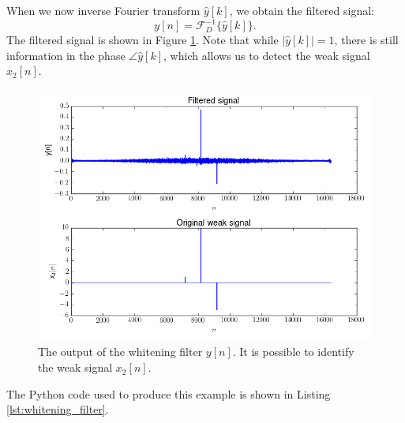 When we now inverse Fourier transform $\hat{y}[k]$, we obtain the filtered signal:
\begin{equation}
  y[n] = \mathcal{F}_D^{-1}\{\hat{y}[k]\}.
\end{equation}
The filtered signal is shown in Figure \ref{fig:whitened_output}.
Note that while $|\hat{y}[k]|=1$, there is still information in the
phase $\angle \hat{y}[k]$, which allows us to detect the weak signal
$x_2[n]$.
\begin{figure}
  \begin{center}
    \includegraphics[width=\textwidth]{ch17/figures/whiten_filtered.png}
  \end{center}
  \caption{The output of the whitening filter $y[n]$. It is possible to identify the weak signal $x_2[n]$.}
  \label{fig:whitened_output}
\end{figure}

The Python code used to produce this example is shown in Listing \ref{lst:whitening_filter}.



